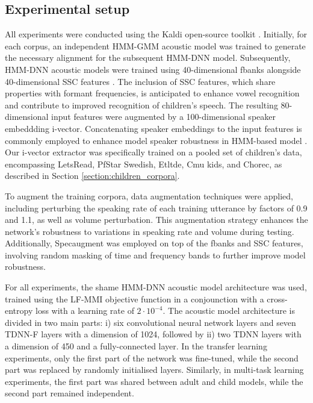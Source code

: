 \subsection{Experimental setup}
\label{section:exp_setup}

All experiments were conducted using the Kaldi open-source toolkit \cite{kaldi}. Initially, for each corpus, an independent \ac{HMM-GMM} acoustic model was trained to generate the necessary alignment for the subsequent \ac{HMM-DNN} model. Subsequently, \ac{HMM-DNN} acoustic models were trained using 40-dimensional fbanks alongside 40-dimensional \ac{SSC} features \cite{ssc}. The inclusion of \ac{SSC} features, which share properties with formant frequencies, is anticipated to enhance vowel recognition and contribute to improved recognition of children's speech. The resulting 80-dimensional input features were augmented by a 100-dimensional speaker embeddding i-vector. Concatenating speaker embeddings to the input features is commonly employed to enhance model speaker robustness in \ac{HMM}-based model \cite{ivector}. Our i-vector extractor was specifically trained on a pooled set of children's data, encompassing LetsRead, PfStar Swedish, Etltde, Cmu kids, and Chorec, as described in Section \ref{section:children_corpora}.

To augment the training corpora, data augmentation techniques were applied, including perturbing the speaking rate of each training utterance by factors of 0.9 and 1.1, as well as volume perturbation. This augmentation strategy enhances the network's robustness to variations in speaking rate and volume during testing. Additionally, Specaugment \cite{specaugment} was employed on top of the fbanks and SSC features, involving random masking of time and frequency bands to further improve model robustness.

For all experiments, the shame \ac{HMM-DNN} acoustic model architecture was used, trained using the \ac{LF-MMI} objective function  in a conjounction with a cross-entropy loss with a learning rate of $2\cdot10^{-4}$. The acoustic model architecture is divided in two main parts: i) six convolutional neural network layers and seven \ac{TDNN-F} layers with a dimension of 1024, followed by ii) two \ac{TDNN} layers with a dimension of 450 and a fully-connected layer. In the transfer learning experiments, only the first part of the network was fine-tuned, while the second part was replaced by randomly initialised layers. Similarly, in multi-task learning experiments, the first part was shared between adult and child models, while the second part remained independent. 


